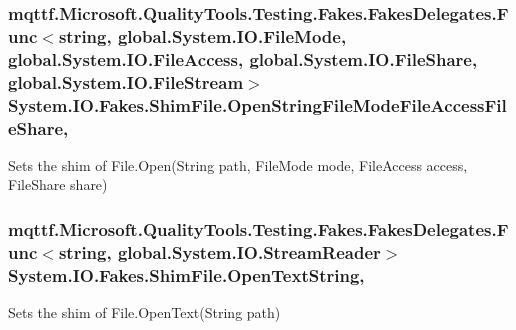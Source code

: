 \hypertarget{class_system_1_1_i_o_1_1_fakes_1_1_shim_file_af584dac5eca163a714c3332674c741dc}{
\subsubsection[{Open\-String\-File\-Mode\-File\-Access\-File\-Share}]{\setlength{\rightskip}{0pt plus 5cm}mqttf.\-Microsoft.\-Quality\-Tools.\-Testing.\-Fakes.\-Fakes\-Delegates.\-Func$<$string, global.\-System.\-I\-O.\-File\-Mode, global.\-System.\-I\-O.\-File\-Access, global.\-System.\-I\-O.\-File\-Share, global.\-System.\-I\-O.\-File\-Stream$>$ System.\-I\-O.\-Fakes.\-Shim\-File.\-Open\-String\-File\-Mode\-File\-Access\-File\-Share\hspace{0.3cm}{\ttfamily [static]}, {\ttfamily [set]}}}\label{class_system_1_1_i_o_1_1_fakes_1_1_shim_file_af584dac5eca163a714c3332674c741dc}


Sets the shim of File.\-Open(\-String path, File\-Mode mode, File\-Access access, File\-Share share)

\hypertarget{class_system_1_1_i_o_1_1_fakes_1_1_shim_file_a43e5724653b410595910ea804329b002}{
\subsubsection[{Open\-Text\-String}]{\setlength{\rightskip}{0pt plus 5cm}mqttf.\-Microsoft.\-Quality\-Tools.\-Testing.\-Fakes.\-Fakes\-Delegates.\-Func$<$string, global.\-System.\-I\-O.\-Stream\-Reader$>$ System.\-I\-O.\-Fakes.\-Shim\-File.\-Open\-Text\-String\hspace{0.3cm}{\ttfamily [static]}, {\ttfamily [set]}}}\label{class_system_1_1_i_o_1_1_fakes_1_1_shim_file_a43e5724653b410595910ea804329b002}


Sets the shim of File.\-Open\-Text(\-String path)

